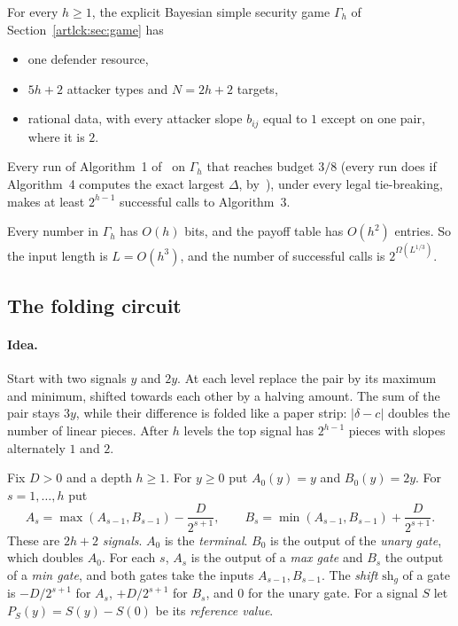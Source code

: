 \begin{theorem}\label{artlck:thm:main}
\statusrefereed
For every $h\ge1$, the explicit Bayesian simple security game $\Gamma_h$ of
Section~\ref{artlck:sec:game} has
\begin{itemize}[nosep]
\item one defender resource,
\item $5h+2$ attacker types and $N=2h+2$ targets,
\item rational data, with every attacker slope $b_{ij}$ equal to $1$ except on one pair, where it is $2$.
\end{itemize}
Every run of Algorithm~1 of~\cite{lck16} on $\Gamma_h$ that reaches budget $3/8$ (every run does if Algorithm~4 computes the exact largest $\Delta$, by~\cite[Theorem~5]{lck16}), under every legal tie-breaking, makes at least
$2^{h-1}$ successful calls to Algorithm~3.
\end{theorem}

\begin{corollary}[Size]\label{artlck:cor:size}
\statusrefereed
Every number in $\Gamma_h$ has $O(h)$ bits, and the payoff table has $O(h^2)$ entries. So the input
length is $L=O(h^3)$, and the number of successful calls is $2^{\Omega(L^{1/3})}$.
\end{corollary}

\subsection{The folding circuit}\label{artlck:sec:fold}

\paragraph{Idea.} Start with two signals $y$ and $2y$. At each level replace the pair by its maximum
and minimum, shifted towards each other by a halving amount. The sum of the pair stays $3y$, while their
difference is folded like a paper strip: $|\delta-c|$ doubles the number of linear pieces. After $h$
levels the top signal has $2^{h-1}$ pieces with slopes alternately $1$ and $2$.

\begin{definition}\label{artlck:def:fold}
Fix $D>0$ and a depth $h\ge1$. For $y\ge0$ put $A_0(y)=y$ and $B_0(y)=2y$. For $s=1,\dots,h$ put
\[
 A_s=\max(A_{s-1},B_{s-1})-\frac{D}{2^{s+1}},\qquad
 B_s=\min(A_{s-1},B_{s-1})+\frac{D}{2^{s+1}} .
\]
These are $2h+2$ \emph{signals}. $A_0$ is the \emph{terminal}. $B_0$ is the output of the \emph{unary
gate}, which doubles $A_0$. For each $s$, $A_s$ is the output of a \emph{max gate} and $B_s$ the output of
a \emph{min gate}, and both gates take the inputs $A_{s-1},B_{s-1}$. The \emph{shift} $\mathrm{sh}_g$ of a
gate is $-D/2^{s+1}$ for $A_s$, $+D/2^{s+1}$ for $B_s$, and $0$ for the unary gate. For a signal $S$ let
$P_S(y)=S(y)-S(0)$ be its \emph{reference value}.
\end{definition}


